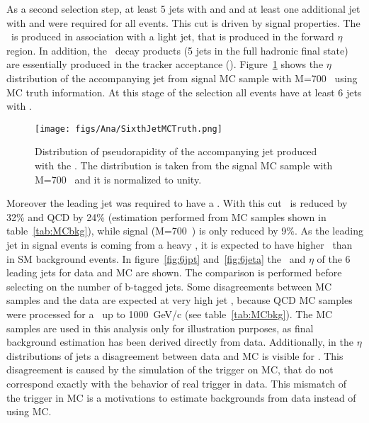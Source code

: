 As a second selection step, at least 5 jets with  and  and at least one additional jet with  and  were required for all events. This cut is driven by signal properties. The \Tp~is produced in association with a light jet, that is produced in the forward $\eta$ region. In addition, the \Tp~decay products (5 jets in the full hadronic final state) are essentially produced in the tracker acceptance (). Figure~\ref{fig:SixthJetTp} shows the $\eta$ distribution of the accompanying jet from signal MC sample with M=700 \GeVcc~using MC truth information. At this stage of the selection all events have at least 6 jets with . %

\begin{figure}[!Hhtbp]
  \begin{center}
    \texttt{[image: figs/Ana/SixthJetMCTruth.png]}
    \caption{Distribution of pseudorapidity of the accompanying jet produced with the \Tp. The distribution is taken from the signal MC sample with M=700 \GeVcc~and it is normalized to unity.}
    \label{fig:SixthJetTp}
  \end{center}
\end{figure}

Moreover the leading jet was required to have a . With this cut \ttbar~is reduced by 32\% and QCD by 24\% (estimation performed from MC samples shown in table~\ref{tab:MCbkg}), while signal (M=700~\GeVcc) is only reduced by 9\%. As the leading jet in signal events is coming from a heavy \Tp, it is expected to have higher \pt~than in SM background events. In figure~\ref{fig:6jpt} and~\ref{fig:6jeta} the \pt~and $\eta$ of the 6 leading jets for data and MC are shown. The comparison is performed before selecting on the number of b-tagged jets. Some disagreements between MC samples and the data are expected at very high jet \pt, because QCD MC samples were processed for a \pt~up to 1000~GeV/c (see table~\ref{tab:MCbkg}). The MC samples are used in this analysis only for illustration purposes, as final background estimation has been derived directly from data. Additionally, in the $\eta$ distributions of jets a disagreement between data and MC is visible for . This disagreement is caused by the simulation of the trigger on MC, that do not correspond exactly with the behavior of real trigger in data. This mismatch of the trigger in MC is a motivations to estimate backgrounds from data instead of using MC. 

